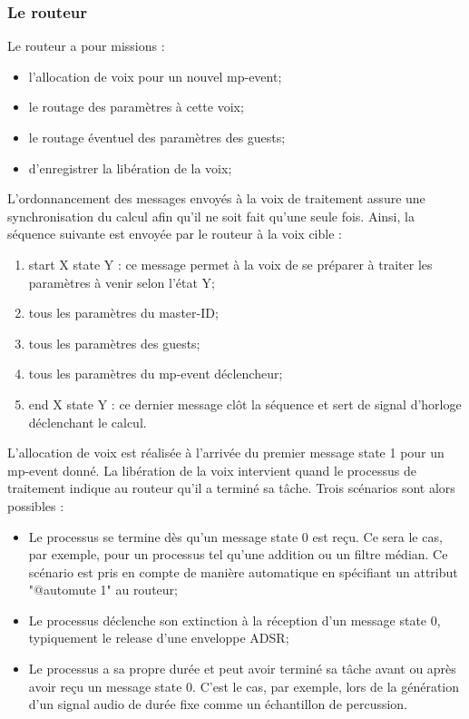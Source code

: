 \subsubsection{Le routeur}

Le routeur a pour missions :
\vspace{-1em}
\begin{itemize}[noitemsep]
	\item l'allocation de voix pour un nouvel mp-event;
	\item le routage des paramètres à cette voix;
	\item le routage éventuel des paramètres des guests;
	\item d'enregistrer la libération de la voix;
\end{itemize}
L'ordonnancement des messages envoyés à la voix de traitement assure une synchronisation du calcul afin qu'il ne soit fait qu'une seule fois. Ainsi, la séquence suivante est envoyée par le routeur à la voix cible :
\vspace{-1em}
\begin{enumerate}[noitemsep]
	\item start X state Y : ce message permet à la voix de se préparer à traiter les paramètres à venir selon l'état Y;
	\item tous les paramètres du master-ID;
	\item tous les paramètres des guests;
	\item tous les paramètres du mp-event déclencheur;
	\item end X state Y : ce dernier message clôt la séquence et sert de signal d'horloge déclenchant le calcul.
\end{enumerate}
L'allocation de voix est réalisée à l'arrivée du premier message state 1 pour un mp-event donné. La libération de la voix intervient quand le processus de traitement indique au routeur qu'il a terminé sa tâche. Trois scénarios sont alors possibles :
\vspace{-1em}
\begin{itemize}[noitemsep]
	\item Le processus se termine dès qu'un message state 0 est reçu. Ce sera le cas, par exemple, pour un processus tel qu'une addition ou un filtre médian. Ce scénario est pris en compte de manière automatique en spécifiant un attribut "@automute 1" au routeur;
	\item Le processus déclenche son extinction à la réception d'un message state 0, typiquement le release d'une enveloppe \gls{ADSR};
	\item Le processus a sa propre durée et peut avoir terminé sa tâche avant ou après avoir reçu un message state 0. C'est le cas, par exemple, lors de la génération d'un signal audio de durée fixe comme un échantillon de percussion.
\end{itemize}

